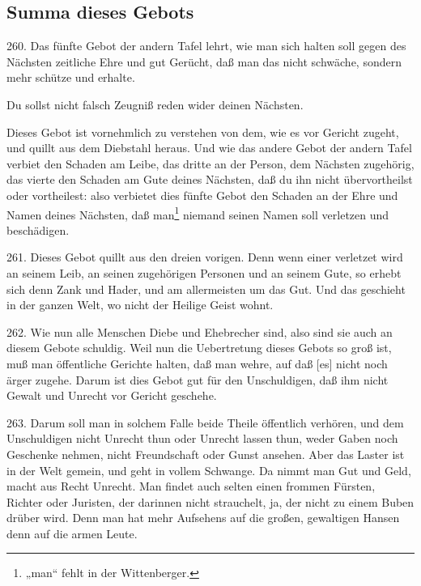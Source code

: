 \subsection{Summa dieses Gebots}

260. Das fünfte Gebot der andern Tafel lehrt, wie man sich halten soll gegen des Nächsten zeitliche Ehre und gut Gerücht, daß man das nicht schwäche, sondern mehr schütze und erhalte.

\begin{schriftzitat}
Du sollst nicht falsch Zeugniß reden wider deinen Nächsten.
\end{schriftzitat}

Dieses Gebot ist vornehmlich zu verstehen von dem, wie es vor Gericht zugeht, und quillt aus dem Diebstahl heraus. Und wie das andere Gebot der andern Tafel verbiet den Schaden am Leibe, das dritte an der Person, dem Nächsten zugehörig, das vierte den Schaden am Gute deines Nächsten, daß du ihn nicht übervortheilst oder vortheilest: also verbietet dies fünfte Gebot den Schaden an der Ehre und Namen deines Nächsten, daß man\footnote{„man“ fehlt in der Wittenberger.} niemand seinen Namen soll verletzen und beschädigen.

261. Dieses Gebot quillt aus den dreien vorigen. Denn wenn einer verletzet wird an seinem Leib, an seinen zugehörigen Personen
und an seinem Gute, so erhebt sich denn Zank und Hader, und am allermeisten um das Gut. Und das geschieht in der ganzen Welt, wo nicht der Heilige Geist wohnt.

262. Wie nun alle Menschen Diebe und Ehebrecher sind, also sind sie auch an diesem Gebote schuldig. Weil nun die Uebertretung dieses Gebots so groß ist, muß man öffentliche Gerichte halten, daß man wehre, auf daß [es] nicht noch ärger zugehe. Darum ist dies Gebot gut für den Unschuldigen, daß ihm nicht Gewalt und Unrecht vor Gericht geschehe.

263. Darum soll man in solchem Falle beide Theile öffentlich verhören, und dem Unschuldigen nicht Unrecht thun oder Unrecht lassen thun, weder Gaben noch Geschenke nehmen, nicht Freundschaft oder Gunst ansehen. Aber das Laster ist in der Welt gemein, und geht in vollem Schwange. Da nimmt man Gut und Geld, macht aus Recht Unrecht. Man findet auch selten einen frommen Fürsten, Richter oder Juristen, der darinnen nicht strauchelt, ja, der nicht zu einem Buben drüber wird. Denn man hat mehr Aufsehens auf die großen, gewaltigen Hansen denn auf die armen Leute.

